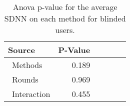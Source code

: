 
\begin{table}[!htb]
\centering
\caption{Anova p-value for the average SDNN on each method for blinded users.}
\label{tab:blocanova_sdnn_two_way_sight}
\begin{tabular}{lrrrrr}
\toprule
          Source & P-Value \\
\midrule
    \    Methods &   0.189 \\
     \    Rounds &   0.969 \\
\    Interaction &   0.455 \\
\bottomrule
\end{tabular}
\end{table}

